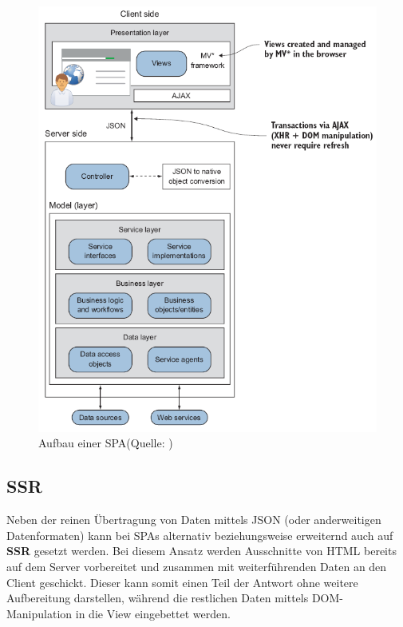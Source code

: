 \documentclass[a4paper,12pt,twoside]{scrreprt}
\begin{document}
\begin{figure}[ht]
    \centering
    \includegraphics[scale=0.60]{images/SPA_overview_Scott.png}
    \caption[Aufbau einer \acl{SPA}]{Aufbau einer \acl{SPA}\newline(Quelle: \cite[][Seite 6]{scott_spa_2015})}
    \label{fig:spa-overview}
\end{figure}

\subsection{\acl{SSR}}
\label{subsec:ssr}
Neben der reinen Übertragung von Daten mittels \acs{JSON} (oder anderweitigen Datenformaten) kann bei \acsp{SPA} alternativ beziehungsweise erweiternd auch auf \textbf{\ac{SSR}} gesetzt werden. Bei diesem Ansatz werden Ausschnitte von HTML bereits auf dem Server vorbereitet und zusammen mit weiterführenden Daten an den Client geschickt. Dieser kann somit einen Teil der Antwort ohne weitere Aufbereitung darstellen, während die restlichen Daten mittels \acs{DOM}-Manipulation in die View eingebettet werden. \parencite[][Seite 7]{scott_spa_2015}
\end{document}
